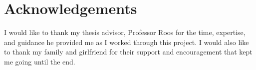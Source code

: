 %
%
\clearpage
\thispagestyle{plain}
\chapter*{Acknowledgements}
I would like to thank my thesis advisor, Professor Roos for the time, expertise, and guidance he provided me as I worked through this project. I would also like to thank my family and girlfriend for their support and encouragement that kept me going until the end.
